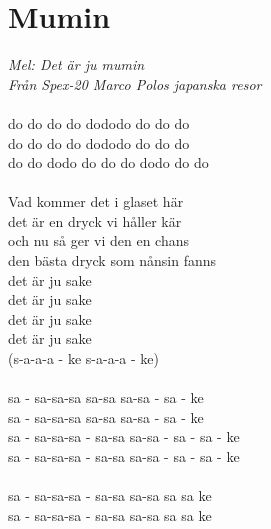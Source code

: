 \documentclass[a5paper,15pt]{article}
\begin{document}
\section{Mumin}
\emph{Mel: Det är ju mumin\\
Från Spex-20 Marco Polos japanska resor} \\
\\
do do do do dododo do do do\\
do do do do dododo do do do\\
do do dodo do do do dodo do do\\
\\
Vad kommer det i glaset här\\
det är en dryck vi håller kär\\
och nu så ger vi den en chans\\
den bästa dryck som nånsin fanns\\
det är ju sake\\
det är ju sake\\
det är ju sake\\
det är ju sake\\
(s-a-a-a - ke  s-a-a-a - ke)\\
\\
sa - sa-sa-sa sa-sa sa-sa - sa - ke\\
sa - sa-sa-sa sa-sa sa-sa - sa - ke\\
sa - sa-sa-sa - sa-sa sa-sa - sa - sa - ke\\
sa - sa-sa-sa - sa-sa sa-sa - sa - sa - ke\\
\\
sa - sa-sa-sa - sa-sa sa-sa  sa sa ke\\
sa - sa-sa-sa - sa-sa sa-sa  sa sa ke\\
\\
\end{document}
